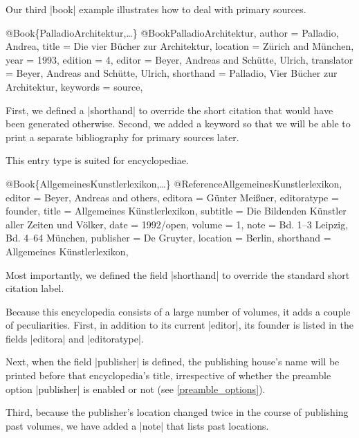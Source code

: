 \documentclass[a4paper,
10pt,
ngerman,
english
]{ltxdoc}
\begin{document}
Our third |book| example illustrates how to deal with primary sources.
\begin{bibexample}[label=PalladioArchitektur]{{@}Book\{PalladioArchitektur,…\}}
@Book{PalladioArchitektur,
  author     = {Palladio, Andrea},
  title      = {Die vier Bücher zur Architektur},
  location   = {Zürich and München},
  year       = {1993},
  edition    = {4},
  editor     = {Beyer, Andreas and Schütte, Ulrich},
  translator = {Beyer, Andreas and Schütte, Ulrich},
  shorthand  = {Palladio, Vier Bücher zur Architektur},
  keywords   = {source},
}
\end{bibexample}
First, we defined a |shorthand| to override the short citation that would have been generated otherwise. Second, we added a keyword so that we will be able to print a separate bibliography for primary sources later.

This entry type is suited for encyclopediae.
\begin{bibexample}[label=AllgemeinesKunstlerlexikon]{{@}Book\{AllgemeinesKunstlerlexikon,…\}}
@Reference{AllgemeinesKunstlerlexikon,
  editor      = {Beyer, Andreas and others},
  editora     = {Günter Meißner},
  editoratype = {founder},
  title       = {Allgemeines Künstlerlexikon},
  subtitle    = {Die Bildenden Künstler aller Zeiten und Völker},
  date        = {1992/open},
  volume      = {1\psqq},
  note        = {Bd. 1--3 Leipzig, Bd. 4--64 München},
  publisher   = {De Gruyter},
  location    = {Berlin},
  shorthand   = {Allgemeines Künstlerlexikon},
}
\end{bibexample}
Most importantly, we defined the field |shorthand| to override the standard short citation label.

Because this encyclopedia consists of a large number of volumes, it adds a couple of peculiarities. First, in addition to its current |editor|, its founder is listed in the fields |editora| and |editoratype|.

Next, when the field |publisher| is defined, the publishing house's name will be printed before that encyclopedia's title, irrespective of whether the preamble option |publisher| is enabled or not (see \cref{preamble_options}).

Third, because the publisher's location changed twice in the course of publishing past volumes, we have added a |note| that lists past locations.
\end{document}
